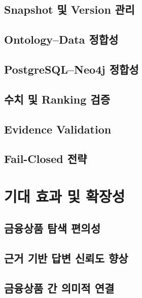 \documentclass[11pt,a4paper]{article}
\begin{document}

\subsection{Snapshot 및 Version 관리}


\subsection{Ontology--Data 정합성}


\subsection{PostgreSQL--Neo4j 정합성}


\subsection{수치 및 Ranking 검증}


\subsection{Evidence Validation}


\subsection{Fail-Closed 전략}


\section{기대 효과 및 확장성}

\subsection{금융상품 탐색 편의성}


\subsection{근거 기반 답변 신뢰도 향상}


\subsection{금융상품 간 의미적 연결}
\end{document}

